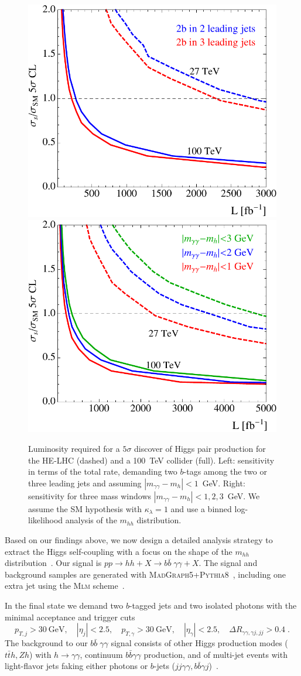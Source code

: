 \label{sec:features}

\begin{figure}[b!]
\centering 
 \includegraphics[width=.4\textwidth]{section3/plots/hh_5sigma_2b3j} 
 \includegraphics[width=.4\textwidth]{section3/plots/hh_5sigma_width}
   \caption{Luminosity required for a $5\sigma$ discover of Higgs pair
     production for the HE-LHC (dashed) and a 100~TeV collider (full).
     Left: sensitivity in terms of the total rate, demanding two
     $b$-tags among the two or three leading jets and assuming
     $|m_{\gamma\gamma}-m_h|<1$~GeV.  Right: sensitivity for three
     mass windows $|m_{\gamma\gamma}-m_h|<1,2,3$~GeV.  We assume the
     SM hypothesis with $\kappa_\lambda=1$ and use a binned
     log-likelihood analysis of the $m_{hh}$ distribution.}
 \label{fig:bound1}
\end{figure}

Based on our findings above, we now design a detailed analysis strategy to extract the Higgs
self-coupling with a focus on the shape of the $m_{hh}$
distribution~\cite{he-lhc-hh}. Our signal is $pp \to hh + X \to b\bar{b} \; \gamma \gamma + X$.
The signal and background samples are generated with
\textsc{MadGraph5}+\textsc{Pythia8}~\cite{mg5,pythia8}, including one
extra jet using the \textsc{Mlm} scheme~\cite{mlm}.\medskip

In the final state we demand two $b$-tagged jets and
two isolated photons with the minimal acceptance and trigger cuts
%
\begin{equation}
p_{T,j}>30~\text{GeV} , \quad  
|\eta_j |<2.5, \quad 
p_{T,\gamma}>30~\text{GeV}, \quad  
|\eta_\gamma| <2.5 , \quad 
\Delta R_{\gamma \gamma, \gamma j, jj} >0.4 \; .
\label{eq:base_selections}
\end{equation}
%
The background to our $b\bar{b} \; \gamma \gamma$ signal consists of
other Higgs production modes ($t\bar{t}h, Zh$) with $h \to \gamma
\gamma$, continuum $b\bar{b}\gamma\gamma$ production, and of multi-jet
events with light-flavor jets faking either photons or $b$-jets
($jj\gamma\gamma, b\bar{b}\gamma j$)~\cite{hh-gamma}.  

